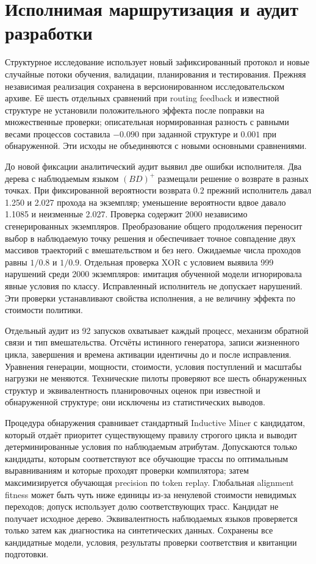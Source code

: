 \section{Исполнимая маршрутизация и аудит разработки}
Структурное исследование использует новый зафиксированный протокол и новые случайные потоки обучения, валидации, планирования и тестирования. Прежняя независимая реализация сохранена в версионированном исследовательском архиве. Её шесть отдельных сравнений при routing feedback и известной структуре не установили положительного эффекта после поправки на множественные проверки; описательная нормированная разность с равными весами процессов составила $-0.090$ при заданной структуре и $0.001$ при обнаруженной. Эти исходы не объединяются с новыми основными сравнениями.

До новой фиксации аналитический аудит выявил две ошибки исполнителя. Два дерева с наблюдаемым языком $(BD)^+$ размещали решение о возврате в разных точках. При фиксированной вероятности возврата $0.2$ прежний исполнитель давал 1.250 и 2.027 прохода на экземпляр; уменьшение вероятности вдвое давало 1.1085 и неизменные 2.027. Проверка содержит 2000 независимо сгенерированных экземпляров. Преобразование общего продолжения переносит выбор в наблюдаемую точку решения и обеспечивает точное совпадение двух массивов траекторий с вмешательством и без него. Ожидаемые числа проходов равны $1/0.8$ и $1/0.9$. Отдельная проверка XOR с условием выявила 999 нарушений среди 2000 экземпляров: имитация обученной модели игнорировала явные условия по классу. Исправленный исполнитель не допускает нарушений. Эти проверки устанавливают свойства исполнения, а не величину эффекта по стоимости политики.

Отдельный аудит из 92 запусков охватывает каждый процесс, механизм обратной связи и тип вмешательства. Отсчёты истинного генератора, записи жизненного цикла, завершения и времена активации идентичны до и после исправления. Уравнения генерации, мощности, стоимости, условия поступлений и масштабы нагрузки не меняются. Технические пилоты проверяют все шесть обнаруженных структур и эквивалентность планировочных оценок при известной и обнаруженной структуре; они исключены из статистических выводов.

Процедура обнаружения сравнивает стандартный Inductive Miner с кандидатом, который отдаёт приоритет существующему правилу строгого цикла и выводит детерминированные условия по наблюдаемым атрибутам. Допускаются только кандидаты, которым соответствуют все обучающие трассы по оптимальным выравниваниям и которые проходят проверки компилятора; затем максимизируется обучающая precision по token replay. Глобальная alignment fitness может быть чуть ниже единицы из-за ненулевой стоимости невидимых переходов; допуск использует долю соответствующих трасс. Кандидат не получает исходное дерево. Эквивалентность наблюдаемых языков проверяется только затем как диагностика на синтетических данных. Сохранены все кандидатные модели, условия, результаты проверки соответствия и квитанции подготовки.

